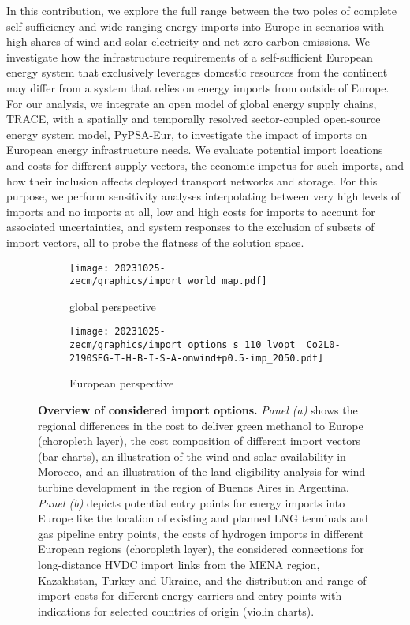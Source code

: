 
In this contribution, we explore the full range between the two poles of
complete self-sufficiency and wide-ranging energy imports into Europe in
scenarios with high shares of wind and solar electricity and net-zero carbon
emissions. We investigate how the infrastructure requirements of a
self-sufficient European energy system that exclusively leverages domestic
resources from the continent may differ from a system that relies on energy
imports from outside of Europe. For our analysis, we integrate an open model of
global energy supply chains, TRACE,\cite{hamppImportOptions2023} with a
spatially and temporally resolved sector-coupled open-source energy system
model, PyPSA-Eur,\cite{PyPSAEurSecSectorCoupled} to investigate the impact of
imports on European energy infrastructure needs. We evaluate potential import
locations and costs for different supply vectors, the economic impetus for such
imports, and how their inclusion affects deployed transport networks and
storage. For this purpose, we perform sensitivity analyses interpolating between
very high levels of imports and no imports at all, low and high costs for
imports to account for associated uncertainties, and system responses to the
exclusion of subsets of import vectors, all to probe the flatness of the
solution space.


\begin{figure*} 
    \begin{subfigure}[t]{\textwidth}
        \caption{global perspective}
        \label{fig:options:global}
        \texttt{[image: 20231025-zecm/graphics/import\_world\_map.pdf]}
    \end{subfigure}
    \begin{subfigure}[t]{\textwidth}
        \caption{European perspective}
        \label{fig:options:europe}
        \centering
        \texttt{[image: 20231025-zecm/graphics/import\_options\_s\_110\_lvopt\_\_Co2L0-2190SEG-T-H-B-I-S-A-onwind+p0.5-imp\_2050.pdf]}
    \end{subfigure}
    \caption{\textbf{Overview of considered import options.}
        \textit{Panel (a)} shows the regional differences in the cost to deliver
        green methanol to Europe (choropleth layer), the cost composition of
        different import vectors (bar charts), an illustration of the wind and
        solar availability in Morocco, and an illustration of the land
        eligibility analysis for wind turbine development in the region of
        Buenos Aires in Argentina. \textit{Panel (b)} depicts potential entry
        points for energy imports into Europe like the location of existing and
        planned LNG terminals and gas pipeline entry points, the costs of
        hydrogen imports in different European regions (choropleth layer), the
        considered connections for long-distance HVDC import links from the MENA
        region, Kazakhstan, Turkey and Ukraine, and the distribution and range
        of import costs for different energy carriers and entry points with
        indications for selected countries of origin (violin charts). }
    \label{fig:options}
\end{figure*}

